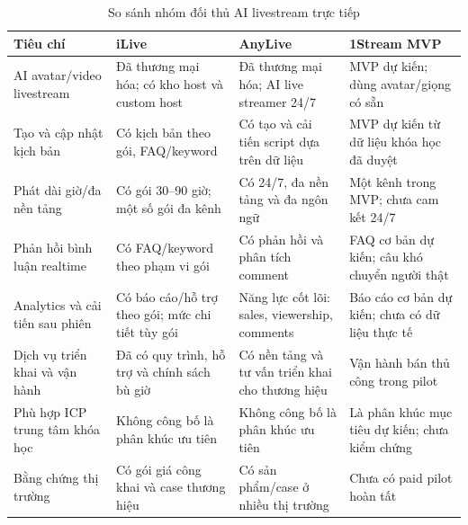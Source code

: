 \begin{table}[H]
    \centering
    \footnotesize
    \setlength{\tabcolsep}{4pt}
    \renewcommand{\arraystretch}{1.28}
    \caption{So sánh nhóm đối thủ AI livestream trực tiếp}
    \label{tab:direct-competitor-comparison}
    \begin{tabularx}{\linewidth}{@{}L{4.2cm}L{3.0cm}L{3.0cm}Y@{}}
        \toprule
        \textbf{Tiêu chí} & \textbf{iLive} & \textbf{AnyLive} &
        \textbf{1Stream MVP} \\ \midrule

        AI avatar/video livestream &
        Đã thương mại hóa; có kho host và custom host &
        Đã thương mại hóa; AI live streamer 24/7 &
        MVP dự kiến; dùng avatar/giọng có sẵn \\

        Tạo và cập nhật kịch bản &
        Có kịch bản theo gói, FAQ/keyword &
        Có tạo và cải tiến script dựa trên dữ liệu &
        MVP dự kiến từ dữ liệu khóa học đã duyệt \\

        Phát dài giờ/đa nền tảng &
        Có gói 30--90 giờ; một số gói đa kênh &
        Có 24/7, đa nền tảng và đa ngôn ngữ &
        Một kênh trong MVP; chưa cam kết 24/7 \\

        Phản hồi bình luận realtime &
        Có FAQ/keyword theo phạm vi gói &
        Có phản hồi và phân tích comment &
        FAQ cơ bản dự kiến; câu khó chuyển người thật \\

        Analytics và cải tiến sau phiên &
        Có báo cáo/hỗ trợ theo gói; mức chi tiết tùy gói &
        Năng lực cốt lõi: sales, viewership, comments &
        Báo cáo cơ bản dự kiến; chưa có dữ liệu thực tế \\

        Dịch vụ triển khai và vận hành &
        Đã có quy trình, hỗ trợ và chính sách bù giờ &
        Có nền tảng và tư vấn triển khai cho thương hiệu &
        Vận hành bán thủ công trong pilot \\

        Phù hợp ICP trung tâm khóa học &
        Không công bố là phân khúc ưu tiên &
        Không công bố là phân khúc ưu tiên &
        Là phân khúc mục tiêu dự kiến; chưa kiểm chứng \\

        Bằng chứng thị trường &
        Có gói giá công khai và case thương hiệu &
        Có sản phẩm/case ở nhiều thị trường &
        Chưa có paid pilot hoàn tất \\ \bottomrule
    \end{tabularx}
\end{table}

